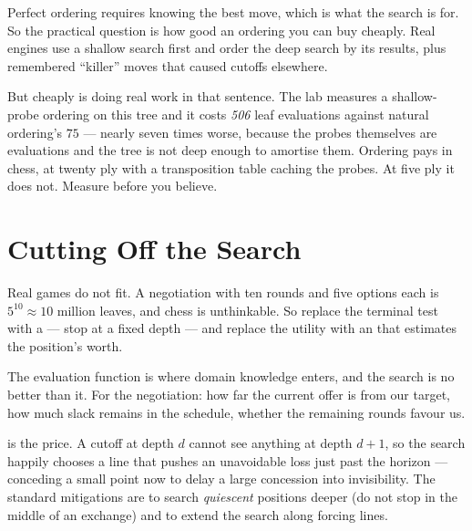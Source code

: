 \begin{conceptbox}
Perfect ordering requires knowing the best move, which is what the search is for.
So the practical question is how good an ordering you can buy cheaply. Real engines
use a shallow search first and order the deep search by its results, plus
remembered ``killer'' moves that caused cutoffs elsewhere.

But cheaply is doing real work in that sentence. The lab measures a shallow-probe
ordering on this tree and it costs \emph{506} leaf evaluations against natural
ordering's $75$ --- nearly seven times worse, because the probes themselves are
evaluations and the tree is not deep enough to amortise them. Ordering pays in
chess, at twenty ply with a transposition table caching the probes. At five ply it
does not. Measure before you believe.
\end{conceptbox}

\section{Cutting Off the Search}

Real games do not fit. A negotiation with ten rounds and five options each is
$5^{10} \approx 10$ million leaves, and chess is unthinkable. So replace the
terminal test with a  --- stop at a fixed depth --- and replace
the utility with an  that estimates the position's worth.

The evaluation function is where domain knowledge enters, and the search is no
better than it. For the negotiation: how far the current offer is from our target,
how much slack remains in the schedule, whether the remaining rounds favour us.

 is the price. A cutoff at depth $d$ cannot see anything at
depth $d+1$, so the search happily chooses a line that pushes an unavoidable loss
just past the horizon --- conceding a small point now to delay a large concession
into invisibility. The standard mitigations are to search \emph{quiescent}
positions deeper (do not stop in the middle of an exchange) and to extend the
search along forcing lines.

